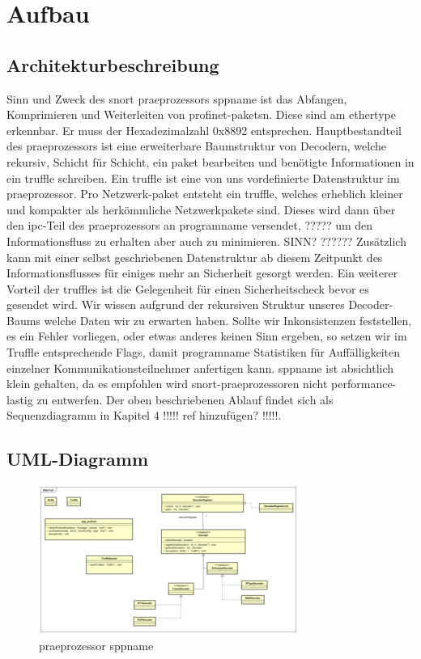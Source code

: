 \chapter{Aufbau \sppname}

\section{Architekturbeschreibung}

Sinn und Zweck des \gls{snort} \gls{praeprozessor}s \gls{sppname} ist das Abfangen,
Komprimieren und Weiterleiten von \gls{profinet}-\glspl{paket}n. Diese
sind am \gls{ethertype} erkennbar. Er muss der Hexadezimalzahl 0x8892 entsprechen.
Hauptbestandteil des \gls{praeprozessor}s ist eine erweiterbare Baumstruktur von Decodern, welche rekursiv, Schicht für Schicht, ein \gls{paket} bearbeiten und benötigte Informationen in ein \gls{truffle} schreiben. Ein \gls{truffle} ist eine von uns vordefinierte Datenstruktur im \gls{praeprozessor}.
Pro Netzwerk-\gls{paket} entsteht ein \gls{truffle}, welches erheblich kleiner und kompakter als herkömmliche Netzwerkpakete sind. Dieses wird dann über den \gls{ipc}-Teil des \gls{praeprozessor}s
an \gls{programname} versendet, ????? um den Informationsfluss zu erhalten aber auch zu minimieren. SINN? ??????\newline
Zusätzlich kann mit einer selbst geschriebenen Datenstruktur ab diesem Zeitpunkt des Informationsflusses für einiges mehr an Sicherheit gesorgt werden.
Ein weiterer Vorteil der \glspl{truffle} ist die Gelegenheit für einen Sicherheitscheck bevor es gesendet wird. Wir wissen aufgrund der rekursiven Struktur unseres Decoder-Baums welche Daten wir zu erwarten haben. Sollte wir Inkonsistenzen feststellen, es ein Fehler vorliegen, oder etwas anderes keinen Sinn ergeben, so setzen wir im Truffle entsprechende Flags, damit \gls{programname} Statistiken für Auffälligkeiten einzelner Kommunikationsteilnehmer anfertigen kann.\newline
\gls{sppname} ist absichtlich klein gehalten, da es empfohlen wird \gls{snort}-\gls{praeprozessor}en nicht performance-lastig zu entwerfen. Der oben beschriebenen Ablauf findet sich als Sequenzdiagramm in Kapitel 4 !!!!! ref hinzufügen? !!!!!.


\section{UML-Diagramm}

\begin{figure}
  \centering
  \includegraphics[width=\paperwidth]{../diagramimages/spp_profinet.png}
  \caption{\gls{praeprozessor} \gls{sppname}}
\end{figure}
